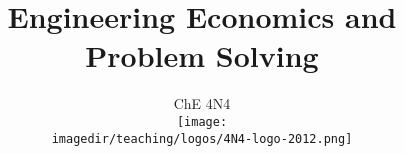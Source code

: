 \documentclass[11pt]{beamer}
\title[]{\Large Engineering Economics and Problem Solving}
\subtitle[]{\Large ChE 4N4 \\ \vspace{0.5cm} \texttt{[image: \\imagedir/teaching/logos/4N4-logo-2012.png]} \vspace{-1.5cm} }
\author[]{}
\institute[]{}
\date[]{\copyright~ Kevin Dunn, \today \\ \vspace{1cm}{\footnotesize {\tt kevin.dunn@mcmaster.ca}\\ http://learnche.mcmaster.ca/4N4\\ \vspace{1cm}}

{\footnotesize Revision: \hgversion (\monthname~\THEYEAR)} %
}
\begin{document}
	
\begin{frame} \titlepage \end{frame}


\end{document}
